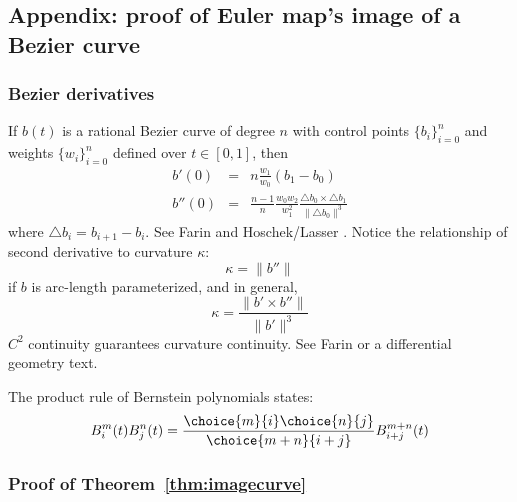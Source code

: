 \documentclass[11pt]{article}
\begin{document}
\subsection{Appendix: proof of Euler map's image of a Bezier curve}

\subsubsection{Bezier derivatives}

If $b(t)$ is a rational Bezier curve of degree $n$ 
with control points $\{b_i\}_{i=0}^n$ and 
weights $\{w_i\}_{i=0}^n$ defined over $t \in [0,1]$, then 
\begin{eqnarray}
\label{eqn:firstderiv}
b'(0) & = & n \frac{w_1}{w_0} (b_1 - b_0) \\
\label{eqn:secondderiv}
b''(0) & = & \frac{n-1}{n} \frac{w_0 w_2}{w_1^2} 
             \frac{\triangle b_0 \times \triangle b_1}{\| \triangle b_0\|^3}
\end{eqnarray}
where $\triangle b_i = b_{i+1} - b_i$.
See Farin \cite{farin02} and Hoschek/Lasser \cite{hoschekLasser0?}. 
Notice the relationship of second derivative to curvature $\kappa$:
\[
    \kappa = \|b''\|
\]
if $b$ is arc-length parameterized, and in general,
\[
    \kappa = \frac{\| b' \times b'' \|}{\| b' \|^3}
\]
$C^2$ continuity guarantees curvature continuity.
See Farin \cite{farin02} or a differential geometry text.

The product rule of Bernstein polynomials \cite{farin02} states:
\[
B_i^m(t) B_j^n(t) = \frac{\choice{m}{i} \choice{n}{j}}{\choice{m+n}{i+j}} B_{i+j}^{m+n}(t)
\]

\subsubsection{Proof of Theorem~\ref{thm:imagecurve}}
\end{document}
